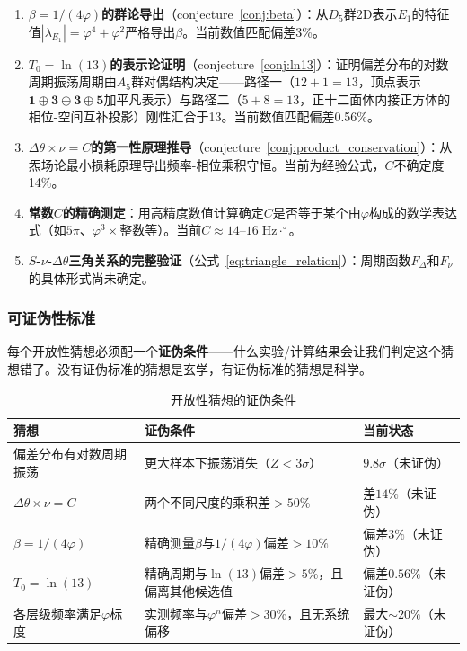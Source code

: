 \documentclass[12pt,a4paper,twocolumn]{article}
\renewcommand{\phi}{\varphi}
\begin{document}
\begin{enumerate}
\item \textbf{$\beta = 1/(4\phi)$的群论导出}（conjecture~\ref{conj:beta}）：从$D_5$群2D表示$E_1$的特征值$|\lambda_{E_1}| = \phi^4 + \phi^2$严格导出$\beta$。当前数值匹配偏差3\%。

\item \textbf{$T_0 = \ln(13)$的表示论证明}（conjecture~\ref{conj:ln13}）：证明偏差分布的对数周期振荡周期由$A_5$群对偶结构决定——路径一（$12+1=13$，顶点表示$\mathbf{1}\oplus\mathbf{3}\oplus\mathbf{3}\oplus\mathbf{5}$加平凡表示）与路径二（$5+8=13$，正十二面体内接正方体的相位-空间互补投影）刚性汇合于13。当前数值匹配偏差0.56\%。

\item \textbf{$\Delta\theta \times \nu = C$的第一性原理推导}（conjecture~\ref{conj:product_conservation}）：从炁场论最小损耗原理导出频率-相位乘积守恒。当前为经验公式，$C$不确定度14\%。

\item \textbf{常数$C$的精确测定}：用高精度数值计算确定$C$是否等于某个由$\phi$构成的数学表达式（如$5\pi$、$\phi^3 \times \text{整数}$等）。当前$C \approx 14$--$16\;\text{Hz}\cdot^\circ$。

\item \textbf{$S$-$\nu$-$\Delta\theta$三角关系的完整验证}（公式~\ref{eq:triangle_relation}）：周期函数$F_\Delta$和$F_\nu$的具体形式尚未确定。
\end{enumerate}

\subsubsection{可证伪性标准}
\label{subsubsec:falsifiability}

每个开放性猜想必须配一个\textbf{证伪条件}——什么实验/计算结果会让我们判定这个猜想错了。没有证伪标准的猜想是玄学，有证伪标准的猜想是科学。

\begin{table}[htbp]
\centering
\caption{开放性猜想的证伪条件}
\label{tab:falsifiability}
\begin{tabular}{lll}
\hline
猜想 & 证伪条件 & 当前状态 \\
\hline
偏差分布有对数周期振荡 & 更大样本下振荡消失（$Z<3\sigma$） & $9.8\sigma$（未证伪） \\
$\Delta\theta \times \nu = C$ & 两个不同尺度的乘积差$>50\%$ & 差$14\%$（未证伪） \\
$\beta = 1/(4\phi)$ & 精确测量$\beta$与$1/(4\phi)$偏差$>10\%$ & 偏差$3\%$（未证伪） \\
$T_0 = \ln(13)$ & 精确周期与$\ln(13)$偏差$>5\%$，且偏离其他候选值 & 偏差$0.56\%$（未证伪） \\
各层级频率满足$\phi$标度 & 实测频率与$\phi^n$偏差$>30\%$，且无系统偏移 & 最大$\sim 20\%$（未证伪） \\
\hline
\end{tabular}
\end{table}
\end{document}
